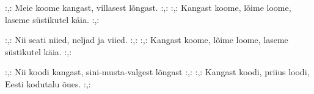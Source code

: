 :,: Meie koome kangast, villasest l\~ongast. :,: 
:,: Kangast koome, l\~oime loome,
laseme s\"ustikutel k\"aia. :,: 

:,: Nii seati niied, neljad ja viied. :,: 
:,: Kangast koome, l\~oime loome,
laseme s\"ustikutel k\"aia. :,: 

:,: Nii koodi kangast, sini-musta-valgest l\~ongast :,: 
:,: Kangast koodi, priius loodi,
Eesti kodutalu \~oues. :,: 